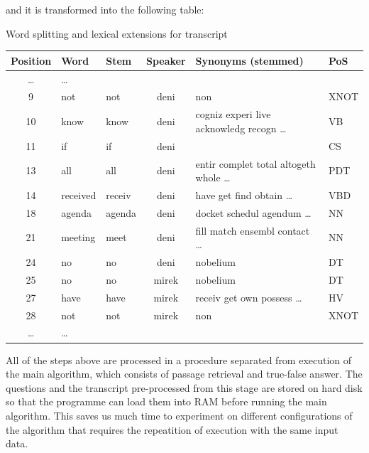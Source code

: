 and it is transformed into the following table:

\begin{center}
\begin{threeparttable}
\scriptsize
\caption{Word splitting and lexical extensions for transcript}
\label{word_splitting_transcript}
\begin{tabular}{|c|l|l|c|l|l|}
\hline  \bf{Position} & \bf{Word} & \bf{Stem} & \bf{Speaker} & \bf{Synonyms (stemmed)} &\bf{PoS} \\
\hline \ldots & \ldots & & & &\\
\hline 9 & not & not & deni & non & XNOT\\
\hline 10 & know & know & deni & cogniz experi live acknowledg recogn \ldots & VB\\
\hline 11 & if & if & deni & & CS\\
\hline 13 & all & all & deni & entir complet total altogeth whole  \ldots & PDT\\
\hline 14 & received & receiv & deni & have get find obtain \ldots &VBD\\
\hline 18 & agenda & agenda & deni & docket schedul agendum \ldots & NN\\
\hline 21 & meeting & meet & deni & fill match ensembl contact \ldots & NN\\
\hline 24 & no & no & deni & nobelium & DT\\
\hline 25 & no & no & mirek & nobelium & DT\\
\hline 27 & have &have &mirek &  receiv get own possess \ldots &HV\\
\hline 28 & not &not &mirek & non&XNOT\\
\hline \ldots & \ldots & & & &\\
\hline 
\end{tabular}
\end{threeparttable}
\end{center}


\normalsize

All of the steps above are processed in a procedure separated from execution of the main algorithm, which consists of passage retrieval and true-false answer. The questions and the transcript pre-processed from this stage are stored on hard disk so that the programme can load them into RAM before running the main algorithm. This saves us much time to experiment on different configurations of the algorithm that requires the repeatition of execution with the same input data.

